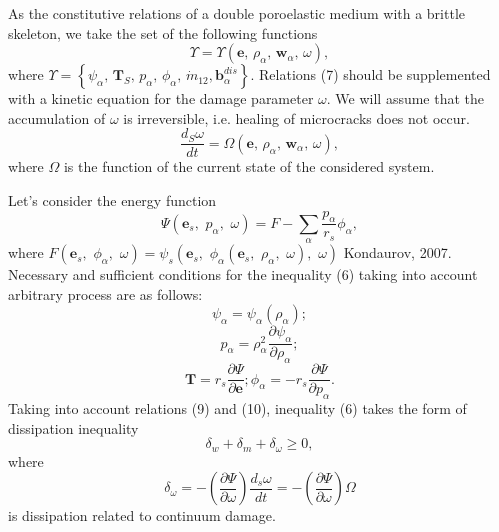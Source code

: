 \documentclass[article,authoryear,jpm]{beg_39}             %
\begin{document}
As the constitutive relations of a double poroelastic medium with a brittle skeleton, we take the set of the following functions
\begin{equation}
\Upsilon =\Upsilon \left( \mathbf{e},\,{{\rho }_{\alpha }},\,{{\mathbf{w}}_{\alpha }},\,\omega \right),
\end{equation}
where $\Upsilon =\left\{ {{\psi }_{\alpha }},\,{{\mathbf{T}}_{S}},\,{{p}_{\alpha }},\,{{\phi }_{\alpha }},\,{{{\dot{m}}}_{12}},\mathbf{b}_{\alpha }^{dis} \right\}$. Relations (7) should be supplemented with a kinetic equation for the damage parameter $\omega$. We will assume that the accumulation of $\omega$ is irreversible, i.e. healing of microcracks does not occur.
\begin{equation}
\frac{{{d}_{S}}\omega }{dt}=\Omega \left( \mathbf{e},\,{{\rho }_{\alpha }},\,{{\mathbf{w}}_{\alpha }},\,\omega \right),
\end{equation}
where $\Omega$ is the function of the current state of the considered system.

Let’s consider the energy function $$\Psi \left( {{\mathbf{e}}_{s}},\,\,{{p}_{\alpha }},\,\,\omega \right)=F-\sum\limits_{\alpha }{\frac{{{p}_{\alpha }}}{{{r}_{s}}}{{\phi }_{\alpha }}},$$ where $F\left( {{\mathbf{e}}_{s}},\,\,{{\phi }_{\alpha }},\,\,\omega \right)={{\psi }_{s}}\left( {{\mathbf{e}}_{s}},\,\,{{\phi }_{\alpha }}\left( {{\mathbf{e}}_{s}},\,\,{{\rho }_{\alpha }},\,\,\omega \right),\,\,\omega \right)$ Kondaurov, 2007. Necessary and sufficient conditions for the inequality (6) taking into account arbitrary process are as follows:
\begin{equation}
{{\psi }_{\alpha }}={{\psi }_{\alpha }}\left( {{\rho }_{\alpha }} \right); 
\end{equation}
\begin{equation}
{{p}_{\alpha }}=\rho _{\alpha }^{2}\frac{\partial {{\psi }_{\alpha }}}{\partial {{\rho }_{\alpha }}};
\end{equation}
\begin{equation}
\mathbf{T}={{r}_{s}}\frac{\partial \Psi }{\partial \mathbf{e}}; {{\phi }_{\alpha }}=-{{r}_{s}}\frac{\partial \Psi }{\partial {{p}_{\alpha }}}.
\end{equation}
Taking into account relations (9) and (10), inequality (6) takes the form of dissipation inequality
\begin{equation}
{{\delta }_{w}}+{{\delta }_{m}}+{{\delta }_{\omega }}\ge 0,
\end{equation}
where $${{\delta }_{\omega }}=-\left( \frac{\partial \Psi }{\partial \omega } \right)\frac{{{d}_{s}}\omega }{dt}=-\left( \frac{\partial \Psi }{\partial \omega } \right)\Omega$$ is dissipation related to continuum damage.
\end{document}
